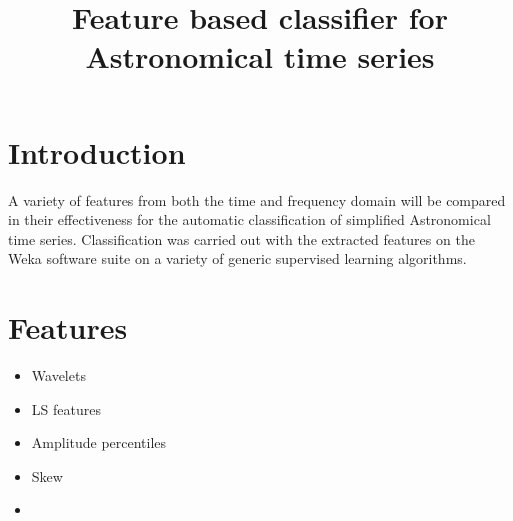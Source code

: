 \documentclass[10pt]{report}
\title{Feature based classifier for Astronomical time series}
\date{}
\begin{document}
	\maketitle
	
	\section{Introduction}
	A variety of features from both the time and frequency domain will be compared in their effectiveness for the automatic classification of simplified Astronomical time series. Classification was carried out with the extracted features on the Weka software suite on a variety of generic supervised learning algorithms.
	
	\section{Features}
	\begin{itemize}
		\item Wavelets
		\item LS features
		\item Amplitude percentiles
		\item Skew
		\item 
	\end{itemize}	
	
			
\end{document}
